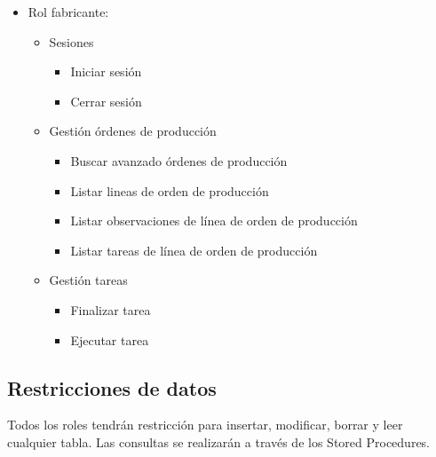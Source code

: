 \begin{itemize}
        \item Rol fabricante:
        \begin{itemize}
            \item Sesiones
            \begin{itemize}
                \item Iniciar sesión
                \item Cerrar sesión
            \end{itemize}
            \item Gestión órdenes de producción
            \begin{itemize}
                \item Buscar avanzado órdenes de producción
                \item Listar lineas de orden de producción
                \item Listar observaciones de línea de orden de producción
                \item Listar tareas de línea de orden de producción
            \end{itemize}
            \item Gestión tareas
            \begin{itemize}
                \item Finalizar tarea
                \item Ejecutar tarea
            \end{itemize}
        \end{itemize}
    \end{itemize}
    \subsection{Restricciones de datos}
    Todos los roles tendrán restricción para insertar, modificar, borrar y leer cualquier tabla. Las consultas se realizarán a través de los Stored Procedures.